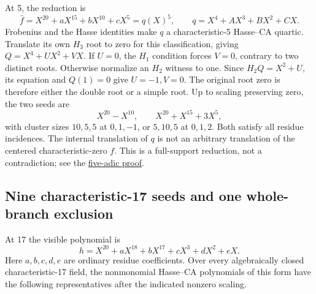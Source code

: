 \documentclass[
  british,
  10pt,
]{article}
\begin{document}
At 5, the reduction is \[
 \bar f=X^{20}+aX^{15}+bX^{10}+cX^5=q(X)^5,\qquad
 q=X^4+AX^3+BX^2+CX.
\] Frobenius and the Hasse identities make \(q\) a characteristic-5
Hasse--CA quartic. Translate its own \(H_3\) root to zero for this
classification, giving \(Q=X^4+UX^2+VX\). If \(U=0\), the \(H_1\)
condition forces \(V=0\), contrary to two distinct roots. Otherwise
normalize an \(H_2\) witness to one. Since \(H_2Q=X^2+U\), its equation
and \(Q(1)=0\) give \(U=-1,V=0\). The original root zero is therefore
either the double root or a simple root. Up to scaling preserving zero,
the two seeds are \[
 X^{20}-X^{10},\qquad X^{20}+X^{15}+3X^5,
\] with cluster sizes \(10,5,5\) at \(0,1,-1\), or \(5,10,5\) at
\(0,1,2\). Both satisfy all residue incidences. The internal translation
of \(q\) is not an arbitrary translation of the centered
characteristic-zero \(f\). This is a full-support reduction, not a
contradiction; see the
\href{evidence/full/five_adic/REDUCTION.md}{five-adic proof}.

\subsection{Nine characteristic-17 seeds and one whole-branch
exclusion}\label{nine-characteristic-17-seeds-and-one-whole-branch-exclusion}

At 17 the visible polynomial is \[
 h=X^{20}+aX^{18}+bX^{17}+cX^3+dX^2+eX.                  \tag{D4}
\] Here \(a,b,c,d,e\) are ordinary residue coefficients. Over every
algebraically closed characteristic-17 field, the nonmonomial Hasse--CA
polynomials of this form have the following representatives after the
indicated nonzero scaling.
\end{document}
